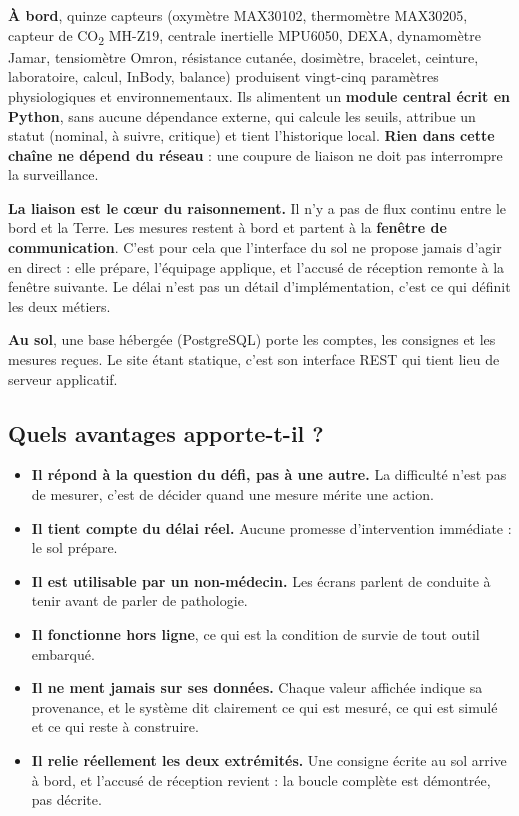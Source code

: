 \documentclass[11pt,a4paper]{article}
\begin{document}
\textbf{\`A bord}, quinze capteurs (oxym\`etre MAX30102, thermom\`etre MAX30205, capteur de CO\textsubscript{2}
MH-Z19, centrale inertielle MPU6050, DEXA, dynamom\`etre Jamar, tensiom\`etre Omron, r\'esistance
cutan\'ee, dosim\`etre, bracelet, ceinture, laboratoire, calcul, InBody, balance) produisent vingt-cinq
param\`etres physiologiques et environnementaux. Ils alimentent un \textbf{module central \'ecrit en
Python}, sans aucune d\'ependance externe, qui calcule les seuils, attribue un statut (nominal, \`a
suivre, critique) et tient l'historique local. \textbf{Rien dans cette cha\^ine ne d\'epend du
r\'eseau} : une coupure de liaison ne doit pas interrompre la surveillance.

\textbf{La liaison est le c\oe{}ur du raisonnement.} Il n'y a pas de flux continu entre le bord et la
Terre. Les mesures restent \`a bord et partent \`a la \textbf{fen\^etre de communication}. C'est pour
cela que l'interface du sol ne propose jamais d'agir en direct : elle pr\'epare, l'\'equipage applique,
et l'accus\'e de r\'eception remonte \`a la fen\^etre suivante. Le d\'elai n'est pas un d\'etail
d'impl\'ementation, c'est ce qui d\'efinit les deux m\'etiers.

\textbf{Au sol}, une base h\'eberg\'ee (PostgreSQL) porte les comptes, les consignes et les mesures
re\c{c}ues. Le site \'etant statique, c'est son interface REST qui tient lieu de serveur applicatif.

\subsection{Quels avantages apporte-t-il ?}

\begin{itemize}
  \item \textbf{Il r\'epond \`a la question du d\'efi, pas \`a une autre.} La difficult\'e n'est pas de
        mesurer, c'est de d\'ecider quand une mesure m\'erite une action.
  \item \textbf{Il tient compte du d\'elai r\'eel.} Aucune promesse d'intervention imm\'ediate : le sol
        pr\'epare.
  \item \textbf{Il est utilisable par un non-m\'edecin.} Les \'ecrans parlent de conduite \`a tenir
        avant de parler de pathologie.
  \item \textbf{Il fonctionne hors ligne}, ce qui est la condition de survie de tout outil embarqu\'e.
  \item \textbf{Il ne ment jamais sur ses donn\'ees.} Chaque valeur affich\'ee indique sa provenance, et
        le syst\`eme dit clairement ce qui est mesur\'e, ce qui est simul\'e et ce qui reste \`a
        construire.
  \item \textbf{Il relie r\'eellement les deux extr\'emit\'es.} Une consigne \'ecrite au sol arrive \`a
        bord, et l'accus\'e de r\'eception revient : la boucle compl\`ete est d\'emontr\'ee, pas
        d\'ecrite.
\end{itemize}
\end{document}
